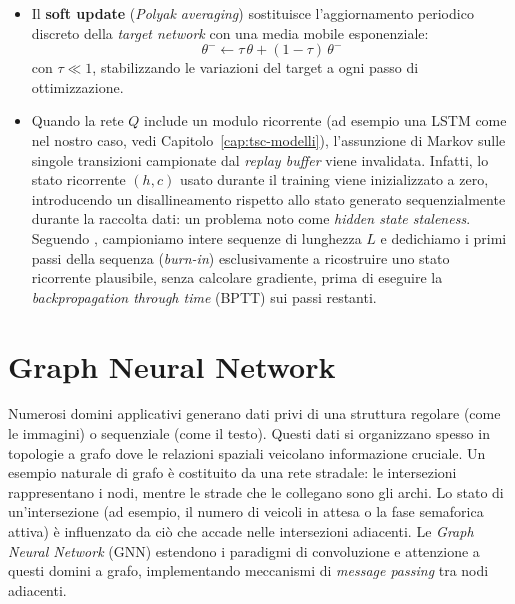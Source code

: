 \begin{itemize}
    \begin{equation}
      L_\delta(y, \hat y) =
      \begin{cases}
        \tfrac{1}{2}(y-\hat y)^2 & \text{se } |y-\hat y| \le \delta \\
        \delta\left(|y-\hat y| - \tfrac{1}{2}\delta\right) & \text{altrimenti}
      \end{cases}
    \end{equation}
    Tipicamente $\delta = 1$.
  \item Il \textbf{soft update} (\emph{Polyak averaging}) sostituisce l'aggiornamento 
    periodico discreto della \emph{target network} con una media mobile esponenziale: 
    \[\theta^- \leftarrow \tau\,\theta + (1-\tau)\,\theta^-\] con $\tau \ll 1$, 
    stabilizzando le variazioni del target a ogni passo di ottimizzazione.
  \item Quando la rete $Q$ include un modulo ricorrente (ad esempio una LSTM come nel nostro caso, vedi Capitolo~\ref{cap:tsc-modelli}), 
    l'assunzione di Markov sulle singole transizioni campionate dal \emph{replay buffer} viene invalidata.
    Infatti, lo stato ricorrente $(h,c)$ usato durante il training viene inizializzato a
    zero, introducendo un disallineamento rispetto allo stato generato sequenzialmente durante la raccolta dati: un problema noto come \emph{hidden state
    staleness}. Seguendo \citet{kapturowski2019r2d2}, campioniamo intere
    sequenze di lunghezza $L$ e dedichiamo i primi passi della sequenza (\emph{burn-in}) esclusivamente a
    ricostruire uno stato ricorrente plausibile, senza calcolare gradiente,
    prima di eseguire la \emph{backpropagation through time} (BPTT) sui
    passi restanti.
\end{itemize}

\section{Graph Neural Network}
\label{sec:background-gnn}

Numerosi domini applicativi generano dati privi di una struttura regolare (come le immagini) o sequenziale (come il testo). 
Questi dati si organizzano spesso in topologie a grafo dove le relazioni spaziali veicolano informazione cruciale.
Un esempio naturale di grafo è costituito da una rete stradale: le intersezioni rappresentano i nodi, mentre le strade che le collegano sono gli archi. 
Lo stato di un'intersezione (ad esempio, il numero di veicoli in attesa o la fase semaforica attiva) è influenzato da ciò che accade nelle intersezioni adiacenti.
Le \emph{Graph Neural Network} (GNN) estendono i paradigmi di convoluzione 
e attenzione a questi domini a grafo, implementando meccanismi di \emph{message passing} tra nodi adiacenti.

